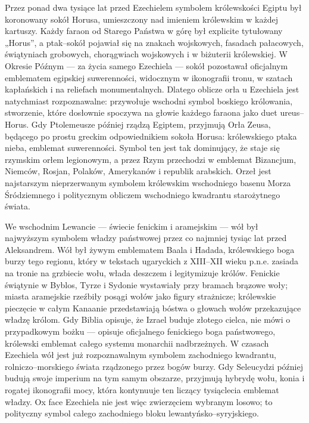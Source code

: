 Przez ponad dwa tysiące lat przed Ezechielem symbolem królewskości Egiptu był koronowany sokół Horusa, umieszczony nad imieniem królewskim w każdej kartuszy.
Każdy faraon od Starego Państwa w górę był explicite tytułowany „Horus”, a ptak–sokół pojawiał się na znakach wojskowych, fasadach pałacowych, świątyniach grobowych, chorągwiach wojskowych i w biżuterii królewskiej.
W Okresie Późnym — za życia samego Ezechiela — sokół pozostawał oficjalnym emblematem egipskiej suwerenności, widocznym w ikonografii tronu, w szatach kapłańskich i na reliefach monumentalnych.
Dlatego oblicze orła u Ezechiela jest natychmiast rozpoznawalne: przywołuje wschodni symbol boskiego królowania, stworzenie, które dosłownie spoczywa na głowie każdego faraona jako duet ureus–Horus.
Gdy Ptolemeusze później rządzą Egiptem, przyjmują Orła Zeusa, będącego po prostu greckim odpowiednikiem sokoła Horusa: królewskiego ptaka nieba, emblemat suwerenności.
Symbol ten jest tak dominujący, że staje się rzymskim orłem legionowym, a przez Rzym przechodzi w emblemat Bizancjum, Niemców, Rosjan, Polaków, Amerykanów i republik arabskich.
Orzeł jest najstarszym nieprzerwanym symbolem królewskim wschodniego basenu Morza Śródziemnego i politycznym obliczem wschodniego kwadrantu starożytnego świata.

We wschodnim Lewancie — świecie fenickim i aramejskim — wół był najwyższym symbolem władzy państwowej przez co najmniej tysiąc lat przed Aleksandrem.
Wół był żywym emblematem Baala i Hadada, królewskiego boga burzy tego regionu, który w tekstach ugaryckich z XIII–XII wieku p.n.e. zasiada na tronie na grzbiecie wołu, włada deszczem i legitymizuje królów.
Fenickie świątynie w Byblos, Tyrze i Sydonie wystawiały przy bramach brązowe woły; miasta aramejskie rzeźbiły posągi wołów jako figury strażnicze; królewskie pieczęcie w całym Kanaanie przedstawiają bóstwa o głowach wołów przekazujące władzę królom.
Gdy Biblia opisuje, że Izrael buduje złotego cielca, nie mówi o przypadkowym bożku — opisuje oficjalnego fenickiego boga państwowego, królewski emblemat całego systemu monarchii nadbrzeżnych.
W czasach Ezechiela wół jest już rozpoznawalnym symbolem zachodniego kwadrantu, rolniczo–morskiego świata rządzonego przez bogów burzy.
Gdy Seleucydzi później budują swoje imperium na tym samym obszarze, przyjmują hybrydę wołu, konia i rogatej ikonografii mocy, która kontynuuje ten liczący tysiąclecia emblemat władzy.
Ox face Ezechiela nie jest więc zwierzęciem wybranym losowo; to polityczny symbol całego zachodniego bloku lewantyńsko–syryjskiego.

